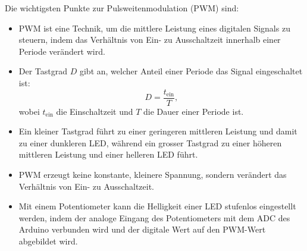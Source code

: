 

\clearpage
\begin{mysummary}
	Die wichtigsten Punkte zur Pulsweitenmodulation (PWM) sind:
	\begin{itemize}
		\item PWM ist eine Technik, um die mittlere Leistung eines digitalen Signals zu steuern, indem das Verhältnis von Ein- zu Ausschaltzeit innerhalb einer Periode verändert wird.
		\item Der Tastgrad $D$ gibt an, welcher Anteil einer Periode das Signal eingeschaltet ist:
		\[
			D = \frac{t_\mathrm{ein}}{T},
		\]
		wobei $t_\mathrm{ein}$ die Einschaltzeit und $T$ die Dauer einer Periode ist.
		\item Ein kleiner Tastgrad führt zu einer geringeren mittleren Leistung und damit zu einer dunkleren LED, während ein grosser Tastgrad zu einer höheren mittleren Leistung und einer helleren LED führt.
		\item PWM erzeugt keine konstante, kleinere Spannung, sondern verändert das Verhältnis von Ein- zu Ausschaltzeit.
		\item Mit einem Potentiometer kann die Helligkeit einer LED stufenlos eingestellt werden, indem der analoge Eingang des Potentiometers mit dem ADC des Arduino verbunden wird und der digitale Wert auf den PWM-Wert abgebildet wird.
	\end{itemize}
\end{mysummary}